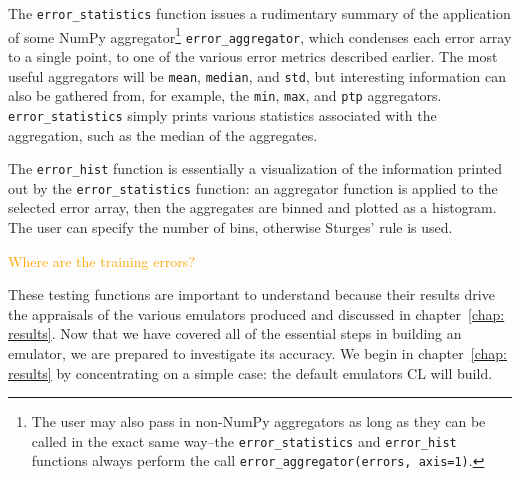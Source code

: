 The \verb|error_statistics| function issues a rudimentary summary of the 
application of some NumPy aggregator\footnote{The user may also pass in
non-NumPy aggregators as long as they can be called in the exact same
way--the \verb|error_statistics| and \verb|error_hist| functions always
perform the call \verb|error_aggregator(errors, axis=1)|.}
\verb|error_aggregator|, which condenses each error array to a single point,
to one of the various error metrics described earlier. The 
most useful aggregators will be \verb|mean|, \verb|median|, and \verb|std|, 
but interesting information can also be gathered from, for example, the
\verb|min|, \verb|max|, and \verb|ptp| aggregators.
\verb|error_statistics| simply prints various statistics associated with the 
aggregation, such as the median of the aggregates.

The \verb|error_hist| function is essentially a visualization of the 
information printed out by the \verb|error_statistics| function: an aggregator
function is applied to the selected error array, then the aggregates are 
binned and plotted as a histogram. The user can specify the number of bins,
otherwise Sturges' rule is used.

\textcolor{orange}{Where are the training errors?}

These testing functions are important to understand because their results
drive the appraisals of the various emulators produced and discussed in
chapter~\ref{chap: results}. Now that we
have covered all of the essential steps in building an emulator, we are
prepared to investigate its accuracy. We begin in
chapter~\ref{chap: results} by concentrating on a simple case: the
default emulators CL will build.


